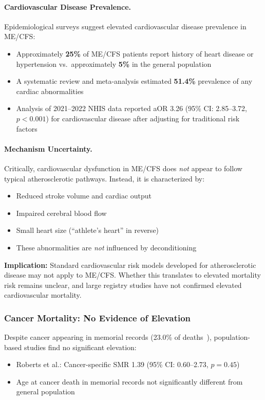 \paragraph{Cardiovascular Disease Prevalence.}
Epidemiological surveys suggest elevated cardiovascular disease prevalence in ME/CFS:
\begin{itemize}
    \item Approximately \textbf{25\%} of ME/CFS patients report history of heart disease or hypertension vs.\ approximately \textbf{5\%} in the general population~\cite{Komaroff1991symptoms}
    \item A systematic review and meta-analysis estimated \textbf{51.4\%} prevalence of any cardiac abnormalities~\cite{vanCampen2019cardiac}
    \item Analysis of 2021--2022 NHIS data reported aOR 3.26 (95\% CI: 2.85--3.72, $p < 0.001$) for cardiovascular disease after adjusting for traditional risk factors~\cite{Denu2025cardiovascular}
\end{itemize}

\paragraph{Mechanism Uncertainty.}
Critically, cardiovascular dysfunction in ME/CFS does \textit{not} appear to follow typical atherosclerotic pathways. Instead, it is characterized by:
\begin{itemize}
    \item Reduced stroke volume and cardiac output
    \item Impaired cerebral blood flow
    \item Small heart size (``athlete's heart'' in reverse)
    \item These abnormalities are \textit{not} influenced by deconditioning
\end{itemize}

\textbf{Implication:} Standard cardiovascular risk models developed for atherosclerotic disease may not apply to ME/CFS. Whether this translates to elevated mortality risk remains unclear, and large registry studies have not confirmed elevated cardiovascular mortality.

\subsubsection{Cancer Mortality: No Evidence of Elevation}

Despite cancer appearing in memorial records (23.0\% of deaths~\cite{Sirotiak2025}), population-based studies find no significant elevation:
\begin{itemize}
    \item Roberts et al.: Cancer-specific SMR 1.39 (95\% CI: 0.60--2.73, $p = 0.45$)~\cite{Roberts2016}
    \item Age at cancer death in memorial records not significantly different from general population
\end{itemize}

